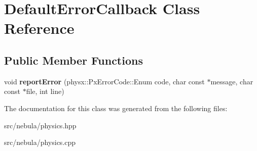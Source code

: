 \hypertarget{classDefaultErrorCallback}{\section{\-Default\-Error\-Callback \-Class \-Reference}
\label{classDefaultErrorCallback}
}
\subsection*{\-Public \-Member \-Functions}
\begin{DoxyCompactItemize}
\item 
\hypertarget{classDefaultErrorCallback_ae95118f6a45b47a1b72af9417f80d84e}{void {\bfseries report\-Error} (physx\-::\-Px\-Error\-Code\-::\-Enum code, char const $\ast$message, char const $\ast$file, int line)}\label{classDefaultErrorCallback_ae95118f6a45b47a1b72af9417f80d84e}

\end{DoxyCompactItemize}


\-The documentation for this class was generated from the following files\-:\begin{DoxyCompactItemize}
\item 
src/nebula/physics.\-hpp\item 
src/nebula/physics.\-cpp\end{DoxyCompactItemize}
